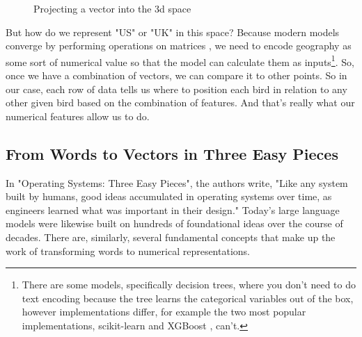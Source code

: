 \documentclass[11pt, table]{diazessay} %
\begin{document}
\begin{sloppypar}
\begin{figure}[htbp]
\begin{adjustbox}{center}
\end{adjustbox}
\caption{Projecting a vector into the 3d space}
\label{fig:my_figure}
\end{figure}

But how do we represent "US" or "UK" in this space? Because modern models converge by performing operations on matrices  \citep{lakshmanan2020machine}, we need to encode geography as some sort of numerical value so that the model can calculate them as inputs\footnote{There are some models, specifically decision trees, where you don't need to do text encoding because the tree learns the categorical variables out of the box, however implementations differ, for example the two most popular implementations, scikit-learn and XGBoost \citep{altay_2020}, can't.}. So, once we have a combination of vectors, we can compare it to other points. So in our case, each row of data tells us where to position each bird in relation to any other given bird based on the combination of features.  And that's really what our numerical features allow us to do.


\subsection{From Words to Vectors in Three Easy Pieces}
In "Operating Systems: Three Easy Pieces", the authors write, "Like any system built by humans, good ideas accumulated in operating systems over time, as engineers learned what was important in their design." \citep{arpaci2018operating} Today's large language models were likewise built on hundreds of foundational ideas over the course of decades.  There are, similarly, several fundamental concepts that make up the work of transforming words to numerical representations.


\end{sloppypar}
\end{document}
